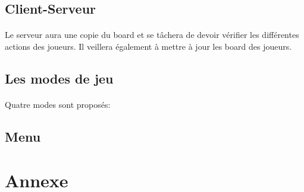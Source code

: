 \documentclass[10pt, a4paper]{article}
\begin{document}
\subsection{Client-Serveur}
\paragraph{}Le serveur aura une copie du board et se tâchera de devoir vérifier les différentes actions des joueurs. Il veillera également à  mettre à jour les board des joueurs.

\subsection{Les modes de jeu}
\paragraph{}Quatre modes sont proposés:
		
\subsection{Menu}
		
\section{Annexe}
	
	
		
		
		
		
\end{document}
